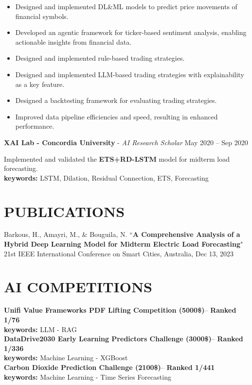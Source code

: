 \documentclass[a4paper,9pt]{extarticle}
\begin{document}
\begin{itemize}
    \item Designed and implemented DL\&ML models to predict price movements of financial symbols.
    \item Developed an agentic framework for ticker-based sentiment analysis, enabling actionable insights from financial data.
    \item Designed and implemented rule-based trading strategies.
    \item Designed and implemented LLM-based trading strategies with explainability as a key feature.
    \item Designed a backtesting framework for evaluating trading strategies.
    \item Improved data pipeline efficiencies and speed, resulting in enhanced performance.
\end{itemize}
\textbf{XAI Lab - Concordia University} - \textit{AI Research Scholar} \hfill May 2020 -- Sep 2020

Implemented and validated the \textbf{ETS+RD-LSTM} model for midterm load forecasting. \\ 
 \phantom{aaa} \textbf{keywords:} LSTM, Dilation, Residual Connection, ETS, Forecasting 
\section*{PUBLICATIONS}
\noindent Barkous, H., Amayri, M., \& Bouguila, N. ``\textbf{A Comprehensive Analysis of a Hybrid Deep Learning Model for Midterm Electric Load Forecasting}" 21st IEEE International Conference on Smart Cities, Australia, Dec 13, 2023
\section*{AI COMPETITIONS}
\textbf{Unifi Value Frameworks PDF Lifting Competition (5000\$)}--  \href{https://github.com/HamdiBarkous/Unifi-Value-Frameworks-PDF-Lifting-Competition}{\textcolor{blue}{\href{https://github.com/HamdiBarkous/Unifi-Value-Frameworks-PDF-Lifting-Competition}{\faGithub}}} \hfill \textbf{Ranked 1/76} \\
\phantom{aaa} \textbf{keywords:} LLM - RAG
\\
\textbf{DataDrive2030 Early Learning Predictors Challenge (3000\$)}--  \href{https://github.com/HamdiBarkous/DataDrive2030-Early-Learning-Predictors-Challenge}{\textcolor{blue}{\href{https://github.com/HamdiBarkous/DataDrive2030-Early-Learning-Predictors-Challenge}{\faGithub}}} \hfill \textbf{Ranked 1/336} \\
\phantom{aaa} \textbf{keywords:} Machine Learning - XGBoost
\\
\textbf{Carbon Dioxide Prediction Challenge (2100\$)}--\href{https://github.com/HamdiBarkous/UmojaHack-Africa-2023-Carbon-Dioxide-Prediction-Challenge}{\textcolor{blue}{\href{https://github.com/HamdiBarkous/UmojaHack-Africa-2023-Carbon-Dioxide-Prediction-Challenge}{\faGithub}}}  \hfill \textbf{Ranked 1/441} \\
\phantom{aaa} \textbf{keywords:} Machine Learning - Time Series Forecasting
\end{document}
